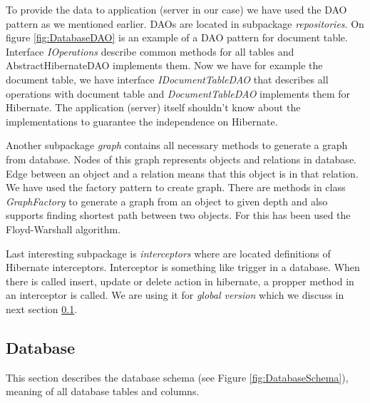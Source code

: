 To provide the data to application (server in our case) we have used the DAO pattern
as we mentioned earlier. DAOs are located in subpackage \emph{repositories}. On figure
\ref{fig:DatabaseDAO} is an example of a DAO pattern for document table. Interface
\emph{IOperations} describe common methods for all tables and AbstractHibernateDAO
implements them. Now we have for example the document table, we have interface
\emph{IDocumentTableDAO} that describes all operations with document table and
\emph{DocumentTableDAO} implements them for Hibernate. The application (server)
itself shouldn't know about the implementations to guarantee the independence
on Hibernate.

Another subpackage \emph{graph} contains all necessary methods to generate a graph
from database. Nodes of this graph represents objects and relations in database.
Edge between an object and a relation means that this object is in that relation.
We have used the factory pattern to create graph. There are methods in class
\emph{GraphFactory} to generate a graph from an object to given depth and also
supports finding shortest path between two objects. For this has been used the Floyd-Warshall
algorithm. 


Last interesting subpackage is \emph{interceptors} where are located definitions
of Hibernate interceptors. Interceptor is something like trigger in a database.
When there is called insert, update or delete action in hibernate, a propper method
in an interceptor is called. We are using it for \emph{global version} which we
discuss in next section \ref{sec:Database}.

\subsection{Database}
\label{sec:Database}

This section describes the database schema (see Figure \ref{fig:DatabaseSchema}), meaning of all database tables and columns.


